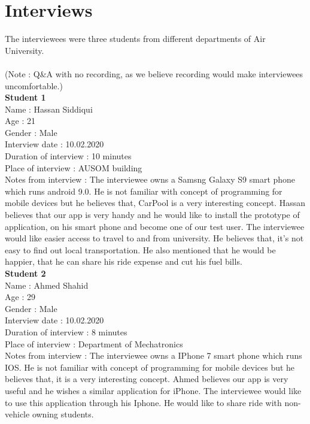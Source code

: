 \chapter{Interviews} \label{ap:Appendix1}

The interviewees were three students from different departments of Air University.\\~\\
(Note : Q\&A with no recording, as we believe recording would make interviewees uncomfortable.)\\

{\textbf{Student 1 }}
\\ Name : Hassan Siddiqui 
\\ Age : 21 
\\ Gender : Male
\\ Interview date : 10.02.2020 
\\ Duration of interview : 10 minutes 
\\ Place of interview : AUSOM building 
\\ Notes from interview : The interviewee owns a Samsng Galaxy S9 smart phone which runs android 9.0. He is not familiar with concept of programming for mobile devices but he believes that, CarPool is a very interesting concept. Hassan believes that our app is very handy and he would like to install the prototype of application, on his smart phone and become one of our test user. The interviewee would like easier access to travel to and from university. He believes that, it's not easy to find out local transportation. He also mentioned that he would be happier, that he can share his ride expense and cut his fuel bills. \\

{\textbf{Student 2 }}
\\ Name : Ahmed Shahid
\\ Age : 29 
\\ Gender : Male
\\ Interview date : 10.02.2020 
\\ Duration of interview : 8 minutes 
\\ Place of interview : Department of Mechatronics
\\ Notes from interview : The interviewee owns a IPhone 7 smart phone which runs IOS. He is not familiar with concept of programming for mobile devices but he believes that, it is a very interesting concept. Ahmed believes our app is very useful and he wishes a similar application for iPhone. The interviewee would like to use this application through his Iphone. He would like to share ride with non-vehicle owning students.\\

